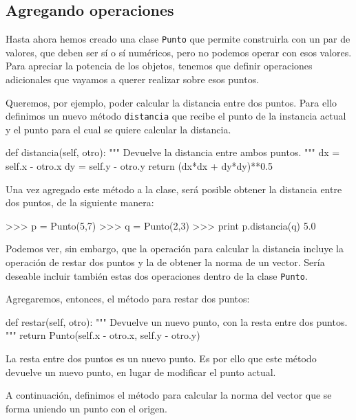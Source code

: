 \subsection{Agregando operaciones}

Hasta ahora hemos creado una clase \lstinline!Punto! que permite
construirla con un par de valores, que deben ser sí o sí numéricos, pero no
podemos operar con esos valores.  Para apreciar la potencia de los objetos,
tenemos que definir operaciones adicionales que vayamos a querer realizar
sobre esos puntos.

Queremos, por ejemplo, poder calcular la distancia entre dos puntos.  Para
ello definimos un nuevo método \lstinline!distancia! que recibe el punto de
la instancia actual y el punto para el cual se quiere calcular la
distancia.

\begin{codigo-python-sn}
    def distancia(self, otro):
        """ Devuelve la distancia entre ambos puntos. """
        dx = self.x - otro.x
        dy = self.y - otro.y
        return (dx*dx + dy*dy)**0.5
\end{codigo-python-sn}

Una vez agregado este método a la clase, será posible obtener la distancia
entre dos puntos, de la siguiente manera:

\begin{codigo-python-sn}
>>> p = Punto(5,7)
>>> q = Punto(2,3)
>>> print p.distancia(q)
5.0
\end{codigo-python-sn}

Podemos ver, sin embargo, que la operación para calcular la distancia
incluye la operación de restar dos puntos y la de obtener la norma de un
vector. Sería deseable incluir también estas dos operaciones dentro de la
clase \lstinline!Punto!.

Agregaremos, entonces, el método para restar dos puntos:

\begin{codigo-python-sn}
    def restar(self, otro):
        """ Devuelve un nuevo punto, con la resta entre dos puntos. """
        return Punto(self.x - otro.x, self.y - otro.y)
\end{codigo-python-sn}

La resta entre dos puntos es un nuevo punto.  Es por ello que este método
devuelve un nuevo punto, en lugar de modificar el punto actual.

A continuación, definimos el método para calcular la norma del vector que
se forma uniendo un punto con el origen.

